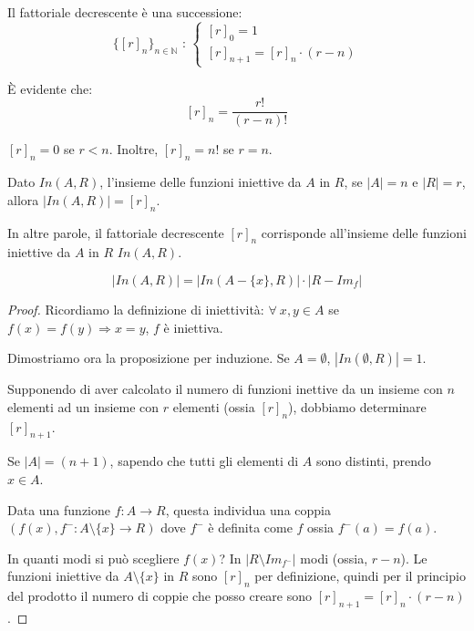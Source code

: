 \begin{defn}
Il fattoriale decrescente \`e una successione:
\begin{equation}
\{[r]_n\}_{n \in \mathbb{N}} \text{ : }
\begin{cases}
[r]_0 = 1 \\
[r]_{n+1} = [r]_n \cdot (r - n)
\end{cases}
\end{equation}
\end{defn}
\`E evidente che:
\[
[r]_n = \frac{r!}{(r-n)!}
\]

\begin{oss}
$[r]_n = 0$ se $r < n$. Inoltre, $[r]_n = n!$ se $r = n$.
\end{oss}

\begin{prop}
Dato $In(A,R)$, l'insieme delle funzioni iniettive da $A$ in $R$, se $|A| = n$ e $|R| = r$, allora $|In (A,R)| = [r]_n$.

In altre parole, il fattoriale decrescente $[r]_n$ corrisponde all'insieme delle funzioni iniettive da $A$ in $R$ $In(A,R)$.

\[
\left| In(A,R) \right| = \left| In (A- \{x\},R) \right| \cdot \left| R - Im_f \right|
\]

\end{prop}
\begin{proof}
Ricordiamo la definizione di iniettivit\`a: $\forall \ x, y \in A$ se $f(x) = f(y) \Rightarrow x = y$, $f$ \`e iniettiva.

Dimostriamo ora la proposizione per induzione. Se $A = \emptyset$, $|In(\emptyset, R)| = 1$.

Supponendo di aver calcolato il numero di funzioni inettive da un insieme con $n$ elementi ad un insieme con $r$ elementi (ossia $[r]_n$), dobbiamo determinare $[r]_{n+1}$.

Se $|A| = (n+1)$, sapendo che tutti gli elementi di $A$ sono distinti, prendo $x \in A$.

Data una funzione $f : A \to R$, questa individua una coppia $(f(x), f^{-} : A \setminus \{ x \} \to R)$ dove $f^{-}$ \`e definita come $f$ ossia $f^{-} (a) = f(a)$.

In quanti modi si pu\`o scegliere $f(x)$? In $|R \setminus Im_{f^-}|$ modi (ossia, $r - n$). Le funzioni iniettive da $A \setminus \{ x \}$ in $R$ sono $[r]_n$ per definizione, quindi per il principio del prodotto il numero di coppie che posso creare sono $[r]_{n+1} = [r]_n \cdot (r - n)$.
\end{proof}

